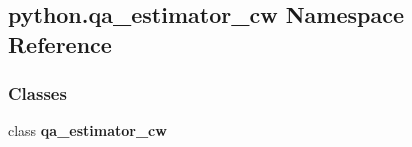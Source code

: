 \subsection{python.\+qa\+\_\+estimator\+\_\+cw Namespace Reference}
\label{namespacepython_1_1qa__estimator__cw}
\subsubsection*{Classes}
\begin{DoxyCompactItemize}
\item 
class {\bf qa\+\_\+estimator\+\_\+cw}
\end{DoxyCompactItemize}
